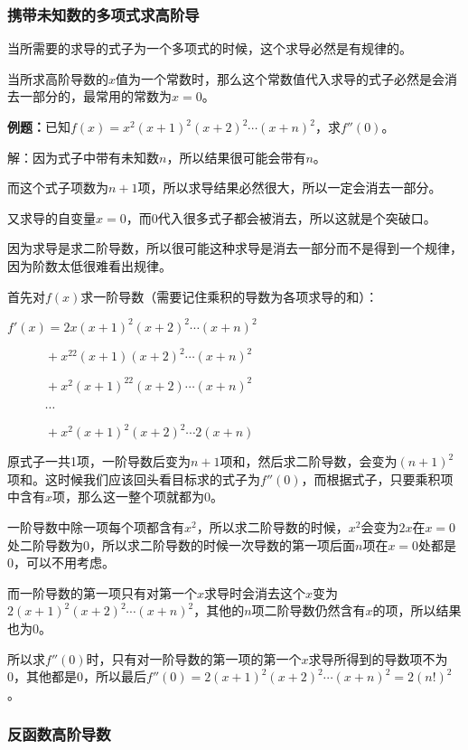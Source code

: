 \documentclass[UTF8, 12pt]{ctexart}
\begin{document}
\subsubsection{携带未知数的多项式求高阶导}

当所需要的求导的式子为一个多项式的时候，这个求导必然是有规律的。

当所求高阶导数的$x$值为一个常数时，那么这个常数值代入求导的式子必然是会消去一部分的，最常用的常数为$x=0$。

\textbf{例题：}已知$f(x)=x^2(x+1)^2(x+2)^2\cdots(x+n)^2$，求$f''(0)$。

解：因为式子中带有未知数$n$，所以结果很可能会带有$n$。

而这个式子项数为$n+1$项，所以求导结果必然很大，所以一定会消去一部分。

又求导的自变量$x=0$，而0代入很多式子都会被消去，所以这就是个突破口。

因为求导是求二阶导数，所以很可能这种求导是消去一部分而不是得到一个规律，因为阶数太低很难看出规律。

首先对$f(x)$求一阶导数（需要记住乘积的导数为各项求导的和）：

$f'(x)=2x(x+1)^2(x+2)^2\cdots(x+n)^2$

$\quad\quad\quad+x^22(x+1)(x+2)^2\cdots(x+n)^2$

$\quad\quad\quad+x^2(x+1)^22(x+2)\cdots(x+n)^2$

$\quad\quad\quad\cdots$

$\quad\quad\quad+x^2(x+1)^2(x+2)^2\cdots 2(x+n)$

原式子一共1项，一阶导数后变为$n+1$项和，然后求二阶导数，会变为$(n+1)^2$项和。这时候我们应该回头看目标求的式子为$f''(0)$，而根据式子，只要乘积项中含有$x$项，那么这一整个项就都为0。

一阶导数中除一项每个项都含有$x^2$，所以求二阶导数的时候，$x^2$会变为$2x$在$x=0$处二阶导数为0，所以求二阶导数的时候一次导数的第一项后面$n$项在$x=0$处都是0，可以不用考虑。

而一阶导数的第一项只有对第一个$x$求导时会消去这个$x$变为$2(x+1)^2(x+2)^2\cdots(x+n)^2$，其他的$n$项二阶导数仍然含有$x$的项，所以结果也为0。

所以求$f''(0)$时，只有对一阶导数的第一项的第一个$x$求导所得到的导数项不为0，其他都是0，所以最后$f''(0)=2(x+1)^2(x+2)^2\cdots(x+n)^2=2(n!)^2$。

\subsubsection{反函数高阶导数}
\end{document}
